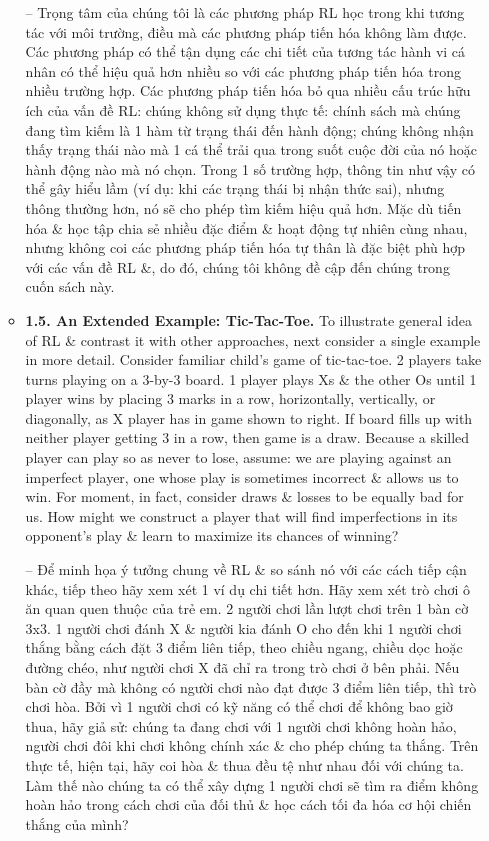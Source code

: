 \documentclass{article}
\begin{document}
\begin{itemize}
\begin{itemize}
        -- Trọng tâm của chúng tôi là các phương pháp RL học trong khi tương tác với môi trường, điều mà các phương pháp tiến hóa không làm được. Các phương pháp có thể tận dụng các chi tiết của tương tác hành vi cá nhân có thể hiệu quả hơn nhiều so với các phương pháp tiến hóa trong nhiều trường hợp. Các phương pháp tiến hóa bỏ qua nhiều cấu trúc hữu ích của vấn đề RL: chúng không sử dụng thực tế: chính sách mà chúng đang tìm kiếm là 1 hàm từ trạng thái đến hành động; chúng không nhận thấy trạng thái nào mà 1 cá thể trải qua trong suốt cuộc đời của nó hoặc hành động nào mà nó chọn. Trong 1 số trường hợp, thông tin như vậy có thể gây hiểu lầm (ví dụ: khi các trạng thái bị nhận thức sai), nhưng thông thường hơn, nó sẽ cho phép tìm kiếm hiệu quả hơn. Mặc dù tiến hóa \& học tập chia sẻ nhiều đặc điểm \& hoạt động tự nhiên cùng nhau, nhưng không coi các phương pháp tiến hóa tự thân là đặc biệt phù hợp với các vấn đề RL \&, do đó, chúng tôi không đề cập đến chúng trong cuốn sách này.
        \item {\bf1.5. An Extended Example: Tic-Tac-Toe.} To illustrate general idea of RL \& contrast it with other approaches, next consider a single example in more detail. Consider familiar child's game of tic-tac-toe. 2 players take turns playing on a 3-by-3 board. 1 player plays Xs \& the other Os until 1 player wins by placing 3 marks in a row, horizontally, vertically, or diagonally, as X player has in game shown to right. If board fills up with neither player getting 3 in a row, then game is a draw. Because a skilled player can play so as never to lose, assume: we are playing against an imperfect player, one whose play is sometimes incorrect \& allows us to win. For moment, in fact, consider draws \& losses to be equally bad for us. How might we construct a player that will find imperfections in its opponent's play \& learn to maximize its chances of winning?

        -- Để minh họa ý tưởng chung về RL \& so sánh nó với các cách tiếp cận khác, tiếp theo hãy xem xét 1 ví dụ chi tiết hơn. Hãy xem xét trò chơi ô ăn quan quen thuộc của trẻ em. 2 người chơi lần lượt chơi trên 1 bàn cờ 3x3. 1 người chơi đánh X \& người kia đánh O cho đến khi 1 người chơi thắng bằng cách đặt 3 điểm liên tiếp, theo chiều ngang, chiều dọc hoặc đường chéo, như người chơi X đã chỉ ra trong trò chơi ở bên phải. Nếu bàn cờ đầy mà không có người chơi nào đạt được 3 điểm liên tiếp, thì trò chơi hòa. Bởi vì 1 người chơi có kỹ năng có thể chơi để không bao giờ thua, hãy giả sử: chúng ta đang chơi với 1 người chơi không hoàn hảo, người chơi đôi khi chơi không chính xác \& cho phép chúng ta thắng. Trên thực tế, hiện tại, hãy coi hòa \& thua đều tệ như nhau đối với chúng ta. Làm thế nào chúng ta có thể xây dựng 1 người chơi sẽ tìm ra điểm không hoàn hảo trong cách chơi của đối thủ \& học cách tối đa hóa cơ hội chiến thắng của mình?


\end{itemize}
\end{itemize}
\end{document}
